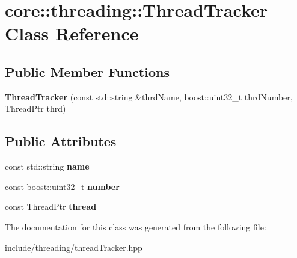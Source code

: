 \hypertarget{classcore_1_1threading_1_1_thread_tracker}{\section{core\-:\-:threading\-:\-:Thread\-Tracker Class Reference}
\label{classcore_1_1threading_1_1_thread_tracker}
}
\subsection*{Public Member Functions}
\begin{DoxyCompactItemize}
\item 
\hypertarget{classcore_1_1threading_1_1_thread_tracker_a93f766d3cc24f5f115c98e2625d2e046}{{\bfseries Thread\-Tracker} (const std\-::string \&thrd\-Name, boost\-::uint32\-\_\-t thrd\-Number, Thread\-Ptr thrd)}\label{classcore_1_1threading_1_1_thread_tracker_a93f766d3cc24f5f115c98e2625d2e046}

\end{DoxyCompactItemize}
\subsection*{Public Attributes}
\begin{DoxyCompactItemize}
\item 
\hypertarget{classcore_1_1threading_1_1_thread_tracker_af12a1618a6666c22f0479215c2a46e53}{const std\-::string {\bfseries name}}\label{classcore_1_1threading_1_1_thread_tracker_af12a1618a6666c22f0479215c2a46e53}

\item 
\hypertarget{classcore_1_1threading_1_1_thread_tracker_ab465a3873065a316c65c2937776142f8}{const boost\-::uint32\-\_\-t {\bfseries number}}\label{classcore_1_1threading_1_1_thread_tracker_ab465a3873065a316c65c2937776142f8}

\item 
\hypertarget{classcore_1_1threading_1_1_thread_tracker_ade9bb77472faac0c28c231d51415ddb3}{const Thread\-Ptr {\bfseries thread}}\label{classcore_1_1threading_1_1_thread_tracker_ade9bb77472faac0c28c231d51415ddb3}

\end{DoxyCompactItemize}


The documentation for this class was generated from the following file\-:\begin{DoxyCompactItemize}
\item 
include/threading/thread\-Tracker.\-hpp\end{DoxyCompactItemize}
